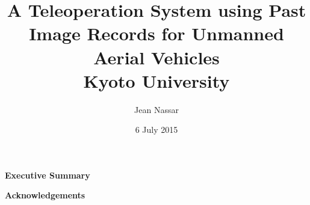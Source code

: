 \title{
  {A Teleoperation System using Past Image Records for Unmanned Aerial Vehicles}\\
  {\large Kyoto University}
}
\author{Jean Nassar}
\date{6 July 2015}

\maketitle

\thispagestyle{empty}
  \null{}
    \begin{flushright}
    \end{flushright}
  \null

\newcommand\summaryname{Executive Summary}
\newenvironment{summary}%
  {\cleardoublepage\thispagestyle{empty}%
    \null\vfill%
    \begin{center}%
      \bfseries \summaryname
    \end{center}}%
  \vfill\null
  \begin{summary}
    \lipsum[1-3]
  \end{summary}

\newcommand\ackname{Acknowledgements}
\newenvironment{acknowledgements}%
  {\cleardoublepage\thispagestyle{empty}%
    \null\vfill%
    \begin{center}%
      \bfseries \ackname
    \end{center}}%
  \vfill\null
  \begin{acknowledgements}
    \lipsum[4-5]
  \end{acknowledgements}

\tableofcontents
\listoffigures
\listoftables

